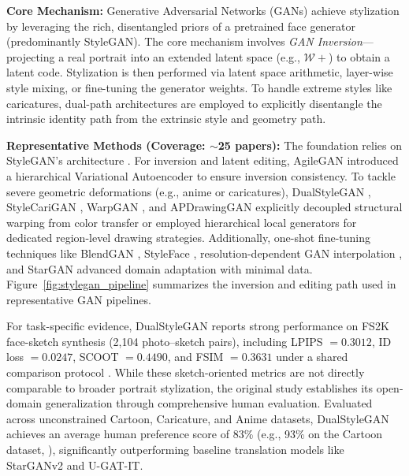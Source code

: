 \documentclass[journal]{IEEEtran}
\begin{document}
\textbf{Core Mechanism:} Generative Adversarial Networks (GANs) achieve stylization by leveraging the rich, disentangled priors of a pretrained face generator (predominantly StyleGAN). The core mechanism involves \textit{GAN Inversion}—projecting a real portrait into an extended latent space (e.g., $\mathcal{W+}$) to obtain a latent code. Stylization is then performed via latent space arithmetic, layer-wise style mixing, or fine-tuning the generator weights. To handle extreme styles like caricatures, dual-path architectures are employed to explicitly disentangle the intrinsic identity path from the extrinsic style and geometry path.

\textbf{Representative Methods (Coverage: $\sim$25 papers):} The foundation relies on StyleGAN's architecture \cite{karras2019style,karras2020stylegan2}. For inversion and latent editing, AgileGAN \cite{song2021agilegan} introduced a hierarchical Variational Autoencoder to ensure inversion consistency. To tackle severe geometric deformations (e.g., anime or caricatures), DualStyleGAN \cite{yang2022dualstylegan}, StyleCariGAN \cite{jang2021stylecarigan}, WarpGAN \cite{shi2018warpganac}, and APDrawingGAN \cite{yi2019apdrawinggan} explicitly decoupled structural warping from color transfer or employed hierarchical local generators for dedicated region-level drawing strategies. Additionally, one-shot fine-tuning techniques like BlendGAN \cite{liu2021blendgan}, StyleFace \cite{sain2023styleface}, resolution-dependent GAN interpolation \cite{pinkney2020resolution}, and StarGAN \cite{choi2018stargan} advanced domain adaptation with minimal data. Figure~\ref{fig:stylegan_pipeline} summarizes the inversion and editing path used in representative GAN pipelines.

For task-specific evidence, DualStyleGAN reports strong performance on FS2K face-sketch synthesis (2,104 photo--sketch pairs), including LPIPS $=0.3012$, ID loss $=0.0247$, SCOOT $=0.4490$, and FSIM $=0.3631$ under a shared comparison protocol \cite[see Tables~4--6]{yang2022dualstylegan}. While these sketch-oriented metrics are not directly comparable to broader portrait stylization, the original study establishes its open-domain generalization through comprehensive human evaluation. Evaluated across unconstrained Cartoon, Caricature, and Anime datasets, DualStyleGAN achieves an average human preference score of 83\% (e.g., 93\% on the Cartoon dataset, \cite[see Table~7]{yang2022dualstylegan}), significantly outperforming baseline translation models like StarGANv2 and U-GAT-IT.
\end{document}
